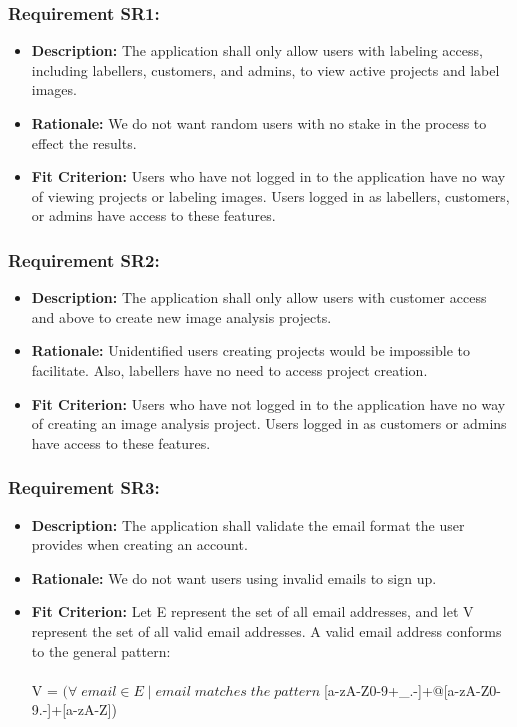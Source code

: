 \documentclass[12pt]{article}
\begin{document}
\subsubsection*{Requirement SR1:}
\begin{itemize}
  \item \textbf{Description:} The application shall only allow users with labeling access, including labellers, customers, and admins, to view active projects and label images.
  \item \textbf{Rationale:} We do not want random users with no stake in the process to effect the results.
  \item \textbf{Fit Criterion:} Users who have not logged in to the application have no way of viewing projects or labeling images. Users logged in as labellers, customers, or admins have access to these features.
\end{itemize}
\subsubsection*{Requirement SR2:}
\begin{itemize}
  \item \textbf{Description:} The application shall only allow users with customer access and above to create new image analysis projects.
  \item \textbf{Rationale:} Unidentified users creating projects would be impossible to facilitate. Also, labellers have no need to access project creation. 
  \item \textbf{Fit Criterion:} Users who have not logged in to the application have no way of creating an image analysis project. Users logged in as customers or admins have access to these features.
\end{itemize}
\subsubsection*{Requirement SR3:}
\begin{itemize}
  \item \textbf{Description:} The application shall validate the email format the user provides when creating an account.
  \item \textbf{Rationale:} We do not want users using invalid emails to sign up.
  \item \textbf{Fit Criterion:} Let E represent the set of all email addresses, and let V represent the set of all valid email addresses. A valid email address conforms to the general pattern:\\\\
  V = $(\forall\; email \in E\;  |\; email \; matches \; the \; pattern \; $[a-zA-Z0-9+\_.-]+@[a-zA-Z0-9.-]+[a-zA-Z])\\
\end{itemize}
\end{document}
